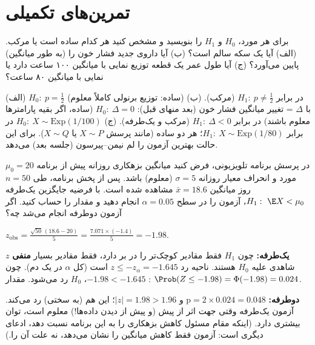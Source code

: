 \section{تمرین‌های تکمیلی}

\begin{exercise}
برای هر مورد، $H_0$ و $H_1$ را بنویسید و مشخص کنید هر کدام ساده است یا مرکب. (الف) آیا یک سکه سالم است؟ (ب) آیا داروی جدید فشار خون را (به طور میانگین) پایین می‌آورد؟ (ج) آیا طول عمر یک قطعه توزیع نمایی با میانگین ۱۰۰ ساعت دارد یا نمایی با میانگین ۸۰ ساعت؟
\end{exercise}
\begin{solution}
(الف) $H_0:\ p=\frac12$ (ساده: توزیع برنولی کاملاً معلوم) در برابر $H_1:\ p\neq\frac12$ (مرکب).
(ب) با $\Delta$ = تغییر میانگین فشار خون (بعد منهای قبل): $H_0:\ \Delta=0$ (ساده، اگر بقیه پارامترها معلوم باشند) در برابر $H_1:\ \Delta<0$ (مرکب و یک‌طرفه).
(ج) $H_0:\ X\sim\mathrm{Exp}(1/100)$ در برابر $H_1:\ X\sim\mathrm{Exp}(1/80)$؛ هر دو ساده (مانند پرسش $X\sim P$ یا $X\sim Q$). برای این حالت بهترین آزمون را لم نیمن--پیرسون (جلسه بعد) می‌دهد.
\end{solution}

\begin{exercise}
در پرسش برنامه تلویزیونی، فرض کنید میانگین بزهکاری روزانه پیش از برنامه $\mu_0=20$ مورد و انحراف معیار روزانه $\sigma=5$ (معلوم) باشد. پس از پخش برنامه، طی $n=50$ روز میانگین $\bar x=18.6$ مشاهده شده است. با فرضیه جایگزین یک‌طرفه $H_1:\ \E X<\mu_0$، آزمون را در سطح $\alpha=0.05$ انجام دهید و مقدار  را حساب کنید. اگر آزمون دوطرفه انجام می‌شد چه؟
\end{exercise}
\begin{solution}
$z_{\text{obs}}=\frac{\sqrt{50}\,(18.6-20)}{5}=\frac{7.071\times(-1.4)}{5}=-1.98$.

\textbf{یک‌طرفه:} چون $H_1$ فقط مقادیر کوچک‌تر را در بر دارد، فقط مقادیر بسیار \textbf{منفی} $z$ شاهدی علیه $H_0$ هستند. ناحیه رد $z\le-z_\alpha=-1.645$ است (کل $\alpha$ در یک دم). چون $-1.98<-1.645$، $H_0$ رد می‌شود. مقدار : $\Prob(Z\le-1.98)=\Phi(-1.98)=0.024$.

\textbf{دوطرفه:} $\text{p}=2\times0.024=0.048$ و $|z|=1.98>1.96$؛ این هم (به سختی) رد می‌کند. آزمون یک‌طرفه وقتی جهت اثر از پیش (و پیش از دیدن داده‌ها!) معلوم است، توان بیشتری دارد. (اینکه مقام مسئول کاهش بزهکاری را به این برنامه نسبت دهد، ادعای دیگری است: آزمون فقط کاهش میانگین را نشان می‌دهد، نه علت آن را.)
\end{solution}

